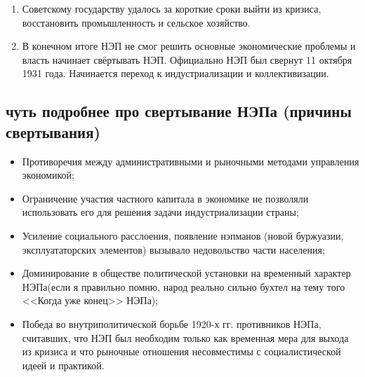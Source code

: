 \begin{enumerate}
    \item Советскому государству удалось за короткие сроки выйти из кризиса, восстановить промышленность и сельское хозяйство.
    \item В конечном итоге НЭП не смог решить основные экономические проблемы и власть начинает свёртывать НЭП. Официально НЭП был свернут 11 октября 1931 года. Начинается переход к индустриализации и коллективизации.
\end{enumerate}

\subsection{чуть подробнее про свертывание НЭПа (причины свертывания)}

\begin{itemize}
    \item Противоречия между административными и рыночными методами управления экономикой;
    \item Ограничение участия частного капитала в экономике не позволяли использовать его для решения задачи индустриализации страны;
    \item Усиление социального расслоения, появление нэпманов (новой буржуазии, эксплуататорских элементов) вызывало недовольство части населения;
    \item Доминирование в обществе политической установки на временный характер НЭПа(если я правильно помню, народ реально сильно бухтел на тему того <<Когда уже конец>> НЭПа);
    \item Победа во внутриполитической борьбе 1920-х гг. противников НЭПа, считавших, что НЭП был необходим только как временная мера для выхода из кризиса и что рыночные отношения несовместимы с социалистической идеей и практикой.
\end{itemize}


